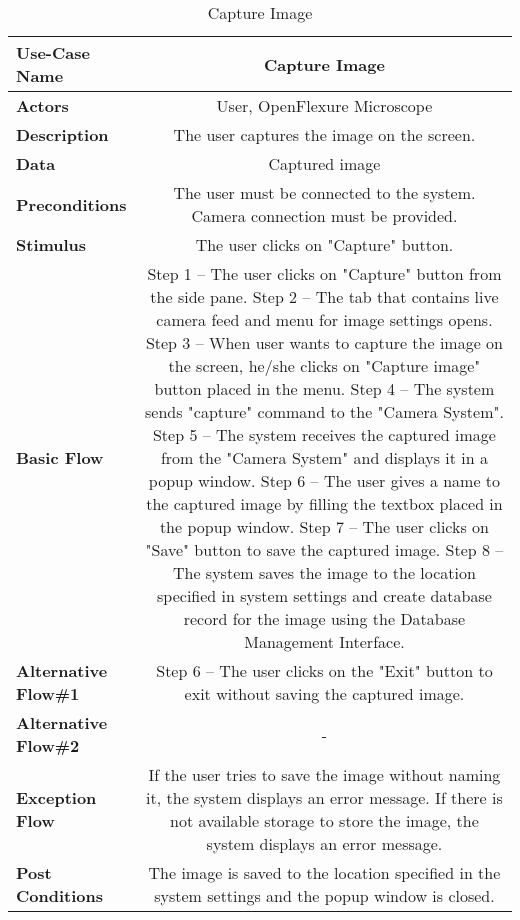 \begin{table}[H]
     \centering
     \begin{tabular}{|l|C|}
         \hline
          \textbf{Use-Case Name} & Capture Image \\
         \hline
          \textbf{Actors} & User, OpenFlexure Microscope \\ 
         \hline
          \textbf{Description} & The user captures the image on the screen. \\ 
         \hline
          \textbf{Data} & Captured image\\ 
         \hline
          \textbf{Preconditions} & 
          The user must be connected to the system. \newline
          Camera connection must be provided. \\
         \hline
          \textbf{Stimulus} & The user clicks on "Capture" button.\\ 
         \hline
          \textbf{Basic Flow} & 
          Step 1 -- The user clicks on "Capture" button from the side pane. \newline
          Step 2 -- The tab that contains live camera feed and menu for image settings opens. \newline
          Step 3 -- When user wants to capture the image on the screen, he/she clicks on "Capture image" button placed in the menu. \newline
          Step 4 -- The system sends "capture" command to the "Camera System". \newline
          Step 5 -- The system receives the captured image from the "Camera System" and displays it in a popup window. \newline
          Step 6 -- The user gives a name to the captured image by filling the textbox placed in the popup window. \newline
		  Step 7 -- The user clicks on "Save" button to save the captured image. \newline
		  Step 8 -- The system saves the image to the location specified in system settings and create database record for the image using the Database Management Interface. \\
         \hline
          \textbf{Alternative Flow\#1} & 
          Step 6 -- The user clicks on the "Exit" button to exit without saving the captured image. \\
         \hline
          \textbf{Alternative Flow\#2} & - \\
         \hline
          \textbf{Exception Flow} & If the user tries to save the image without naming it, the system displays an error message. If there is not available storage to store the image, the system displays an error message.\\
         \hline
          \textbf{Post Conditions} & The image is saved to the location specified in the system settings and the popup window is closed. \\ 
         \hline
     \end{tabular}
     \caption{Capture Image}
     \label{tab:capture_image}
 \end{table}